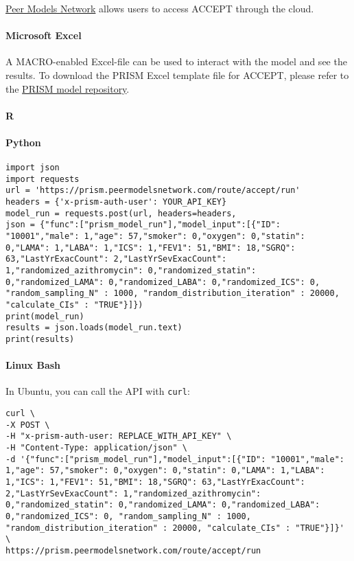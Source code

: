 \documentclass[
]{book}
\begin{document}
\href{http://prism.resp.core.ubc.ca}{Peer Models Network} allows users to access ACCEPT through the cloud.

\hypertarget{microsoft-excel}{%
\paragraph{Microsoft Excel}\label{microsoft-excel}}

A MACRO-enabled Excel-file can be used to interact with the model and see the results. To download the PRISM Excel template file for ACCEPT, please refer to the \href{http://resp.core.ubc.ca/ipress/prism}{PRISM model repository}.

\hypertarget{r}{%
\paragraph{R}\label{r}}

\hypertarget{python}{%
\paragraph{Python}\label{python}}

\begin{verbatim}
import json
import requests
url = 'https://prism.peermodelsnetwork.com/route/accept/run'
headers = {'x-prism-auth-user': YOUR_API_KEY}
model_run = requests.post(url, headers=headers,
json = {"func":["prism_model_run"],"model_input":[{"ID": "10001","male": 1,"age": 57,"smoker": 0,"oxygen": 0,"statin": 0,"LAMA": 1,"LABA": 1,"ICS": 1,"FEV1": 51,"BMI": 18,"SGRQ": 63,"LastYrExacCount": 2,"LastYrSevExacCount": 1,"randomized_azithromycin": 0,"randomized_statin": 0,"randomized_LAMA": 0,"randomized_LABA": 0,"randomized_ICS": 0, "random_sampling_N" : 1000, "random_distribution_iteration" : 20000, "calculate_CIs" : "TRUE"}]})
print(model_run)
results = json.loads(model_run.text)
print(results)
\end{verbatim}

\hypertarget{linux-bash}{%
\paragraph{Linux Bash}\label{linux-bash}}

In Ubuntu, you can call the API with \texttt{curl}:

\begin{verbatim}
curl \
-X POST \
-H "x-prism-auth-user: REPLACE_WITH_API_KEY" \
-H "Content-Type: application/json" \
-d '{"func":["prism_model_run"],"model_input":[{"ID": "10001","male": 1,"age": 57,"smoker": 0,"oxygen": 0,"statin": 0,"LAMA": 1,"LABA": 1,"ICS": 1,"FEV1": 51,"BMI": 18,"SGRQ": 63,"LastYrExacCount": 2,"LastYrSevExacCount": 1,"randomized_azithromycin": 0,"randomized_statin": 0,"randomized_LAMA": 0,"randomized_LABA": 0,"randomized_ICS": 0, "random_sampling_N" : 1000, "random_distribution_iteration" : 20000, "calculate_CIs" : "TRUE"}]}' \
https://prism.peermodelsnetwork.com/route/accept/run
\end{verbatim}

  
\end{document}
